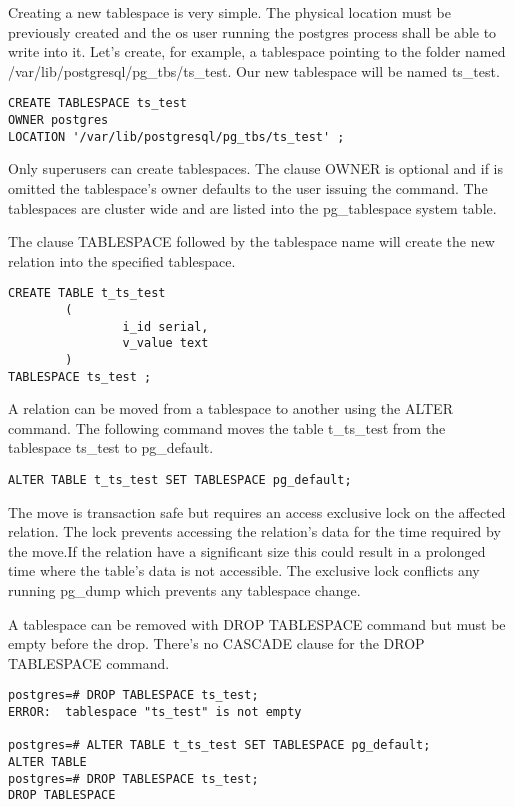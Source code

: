 Creating a new tablespace is very simple. The physical location must be previously created and the os
user running the postgres process shall be able to write into it. Let's create, for example, a tablespace
pointing to the folder named /var/lib/postgresql/pg\_tbs/ts\_test. Our new tablespace will be named
ts\_test.

\begin{lstlisting}[style=pgsql]
CREATE TABLESPACE ts_test 
OWNER postgres
LOCATION '/var/lib/postgresql/pg_tbs/ts_test' ;

\end{lstlisting}

Only superusers can create tablespaces. The clause OWNER is optional and if  is omitted the tablespace's
owner defaults to the user issuing the command. The tablespaces are cluster wide and are listed into the
pg\_tablespace system table.\newline

The clause TABLESPACE followed by the tablespace name will create the new relation into the specified
tablespace.

\begin{lstlisting}[style=pgsql]
CREATE TABLE t_ts_test
        (
                i_id serial,
                v_value text
        )
TABLESPACE ts_test ;

\end{lstlisting}

A relation can be moved from a tablespace to another using the ALTER command. The following command
moves the table t\_ts\_test from the tablespace ts\_test to pg\_default.

\begin{lstlisting}[style=pgsql]
ALTER TABLE t_ts_test SET TABLESPACE pg_default;
\end{lstlisting}

The move is transaction safe but requires an access exclusive lock on the affected relation. The lock
prevents accessing the relation's data for the time required by the move.If the relation have a
significant size this could result in a prolonged time where the table's data is not accessible.
The exclusive lock conflicts any running pg\_dump which prevents any tablespace change.\newline


A tablespace can be removed with DROP TABLESPACE command but must be empty before the drop. There's no
CASCADE clause for the DROP TABLESPACE command.

\begin{lstlisting}[style=pgsql]
postgres=# DROP TABLESPACE ts_test;
ERROR:  tablespace "ts_test" is not empty

postgres=# ALTER TABLE t_ts_test SET TABLESPACE pg_default;
ALTER TABLE
postgres=# DROP TABLESPACE ts_test;
DROP TABLESPACE

\end{lstlisting}


